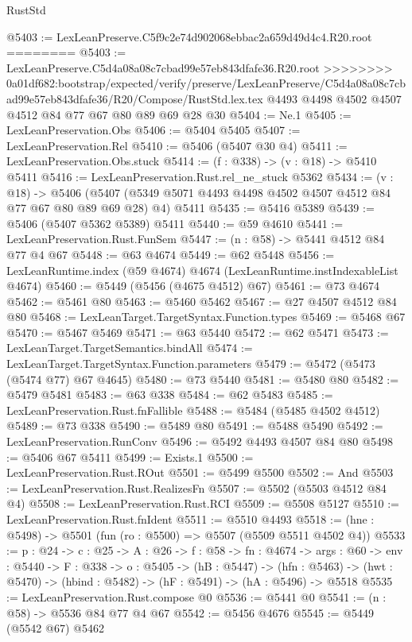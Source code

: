 \begin{lexlean}{RustStd}
\begin{coremodule}
{\begin{coremodule}
{{{{{{{{@5403 := LexLeanPreserve.C5f9c2e74d902068ebbac2a659d49d4c4.R20.root
========
@5403 := LexLeanPreserve.C5d4a08a08c7cbad99e57eb843dfafe36.R20.root
>>>>>>>> 0a01df682:bootstrap/expected/verify/preserve/LexLeanPreserve/C5d4a08a08c7cbad99e57eb843dfafe36/R20/Compose/RustStd.lex.tex
    @4493
    @4498
    @4502
    @4507
    @4512
    @84
    @77
    @67
    @80
    @89
    @69
    @28
    @30
@5404 := Ne.{1}
@5405 := LexLeanPreservation.Obs
@5406 := @5404 @5405
@5407 := LexLeanPreservation.Rel
@5410 := @5406 (@5407 @30 @4)
@5411 := LexLeanPreservation.Obs.stuck
@5414 := (f : @338) -> (v : @18) -> @5410 @5411
@5416 := LexLeanPreservation.Rust.rel_ne_stuck @5362
@5434 := (v : @18) ->
  @5406 (@5407 (@5349 @5071 @4493 @4498 @4502 @4507 @4512 @84 @77 @67 @80 @89 @69 @28) @4) @5411
@5435 := @5416 @5389
@5439 := @5406 (@5407 @5362 @5389) @5411
@5440 := @59 @4610
@5441 := LexLeanPreservation.Rust.FunSem
@5447 := (n : @58) -> @5441 @4512 @84 @77 @4 @67
@5448 := @63 @4674
@5449 := @62 @5448
@5456 := LexLeanRuntime.index (@59 @4674) @4674 (LexLeanRuntime.instIndexableList @4674)
@5460 := @5449 (@5456 (@4675 @4512) @67)
@5461 := @73 @4674
@5462 := @5461 @80
@5463 := @5460 @5462
@5467 := @27 @4507 @4512 @84 @80
@5468 := LexLeanTarget.TargetSyntax.Function.types
@5469 := @5468 @67
@5470 := @5467 @5469
@5471 := @63 @5440
@5472 := @62 @5471
@5473 := LexLeanTarget.TargetSemantics.bindAll
@5474 := LexLeanTarget.TargetSyntax.Function.parameters
@5479 := @5472 (@5473 (@5474 @77) @67 @4645)
@5480 := @73 @5440
@5481 := @5480 @80
@5482 := @5479 @5481
@5483 := @63 @338
@5484 := @62 @5483
@5485 := LexLeanPreservation.Rust.fnFallible
@5488 := @5484 (@5485 @4502 @4512)
@5489 := @73 @338
@5490 := @5489 @80
@5491 := @5488 @5490
@5492 := LexLeanPreservation.RunConv
@5496 := @5492 @4493 @4507 @84 @80
@5498 := @5406 @67 @5411
@5499 := Exists.{1}
@5500 := LexLeanPreservation.Rust.ROut
@5501 := @5499 @5500
@5502 := And
@5503 := LexLeanPreservation.Rust.RealizesFn
@5507 := @5502 (@5503 @4512 @84 @4)
@5508 := LexLeanPreservation.Rust.RCI
@5509 := @5508 @5127
@5510 := LexLeanPreservation.Rust.fnIdent
@5511 := @5510 @4493
@5518 := (hne : @5498) -> @5501 (fun (ro : @5500) => @5507 (@5509 @5511 @4502 @4))
@5533 := {p : @24} ->
  {c : @25} ->
  {A : @26} ->
  {f : @58} ->
  {fn : @4674} ->
  {args : @60} ->
  {env : @5440} ->
  {F : @338} ->
  {o : @5405} ->
  (hB : @5447) ->
  (hfn : @5463) -> (hwt : @5470) -> (hbind : @5482) -> (hF : @5491) -> (hA : @5496) -> @5518
@5535 := LexLeanPreservation.Rust.compose @0
@5536 := @5441 @0
@5541 := (n : @58) -> @5536 @84 @77 @4 @67
@5542 := @5456 @4676
@5545 := @5449 (@5542 @67) @5462
}}}}}}}}
\end{coremodule}}
\end{coremodule}
\end{lexlean}
